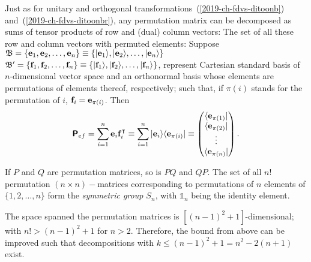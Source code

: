 Just as for unitary and orthogonal transformations~(\ref{2019-ch-fdvs-ditoonb})
and~(\ref{2019-ch-fdvs-ditoonbr}),
any permutation matrix can be decomposed as sums of tensor products of row and (dual) column vectors:
The set of all these row and column vectors
with permuted elements:
Suppose
${\frak B}=\{{\bf e}_1,  {\bf e}_2, \ldots , {\bf e}_n\}\equiv \{\vert {\bf e}_1\rangle , \vert  {\bf e}_2\rangle , \ldots , \vert {\bf e}_n\rangle \}$
${\frak B}'=\{{\bf f}_1,  {\bf f}_2, \ldots , {\bf f}_n\}\equiv \{\vert {\bf f}_1\rangle , \vert  {\bf f}_2\rangle , \ldots , \vert {\bf f}_n\rangle \}$,
represent
Cartesian standard basis of $n$-dimensional vector space
and an orthonormal basis whose elements are permutations of elements thereof,
respectively; such that, if $\pi (i)$ stands for the permutation of $i$, ${\bf f}_i = {\bf e}_{\pi (i)}$.
Then
\begin{equation}
\textsf{\textbf{P}}_{ef}= \sum_{i=1}^n  {\bf e}_i {\bf f}_i^\intercal
\equiv \sum_{i=1}^n  \vert {\bf e}_i\rangle \langle {\bf e}_{\pi (i)} \vert
\equiv
\begin{pmatrix}
\langle {\bf e}_{\pi (1)} \vert \\
\langle {\bf e}_{\pi (2)} \vert \\
\vdots \\
\langle {\bf e}_{\pi (n)} \vert \\
\end{pmatrix}
.
\label{2019-ch-fdvs-ditoonbp}
\end{equation}

If $P$ and $Q$ are permutation matrices, so is $PQ$ and $QP$.
The set of all $n!$
permutation $(n\times n)-$matrices corresponding to permutations of $n$ elements of $\{ 1,2,\ldots ,n\}$ form the
{\em symmetric group $S_n$}, with $\mathbb{1}_n$ being the identity element.


The space spanned the permutation matrices is $\left[(n-1)^2+1\right]$-dimensional;
with $n!>(n-1)^2+1$ for $n>2$.
Therefore,  the bound from above can be improved such that decompositions with $k \le (n-1)^2 +1= n^2-2(n+1)$
exist.\cite[-20mm]{Marcus-Ree-1959}

